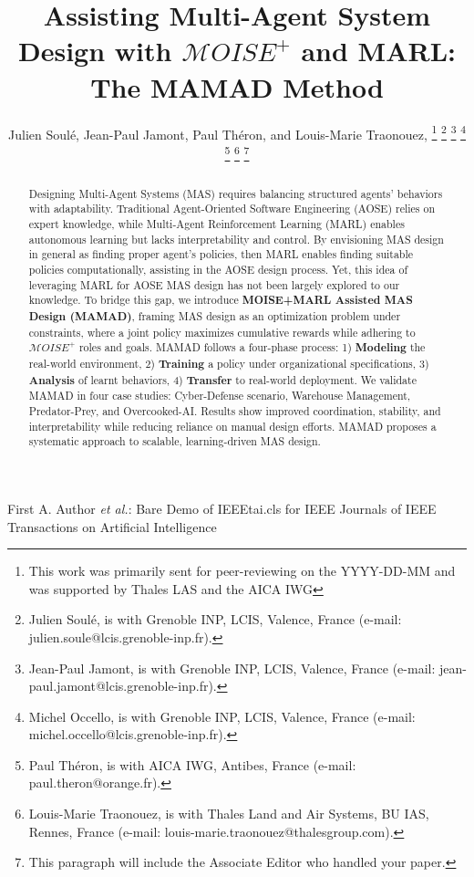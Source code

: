 \documentclass[journal]{IEEEtai}
\begin{document}
\title{Assisting Multi-Agent System Design with $\mathcal{M}OISE^+$ and MARL: The MAMAD Method} 


\author{Julien Soulé, Jean-Paul Jamont, Paul Théron, and Louis-Marie Traonouez,
\thanks{This work was primarily sent for peer-reviewing on the YYYY-DD-MM and was supported by Thales LAS and the AICA IWG}
\thanks{Julien Soulé, is with Grenoble INP, LCIS, Valence, France (e-mail: julien.soule@lcis.grenoble-inp.fr).}
\thanks{Jean-Paul Jamont, is with Grenoble INP, LCIS, Valence, France (e-mail: jean-paul.jamont@lcis.grenoble-inp.fr).}
\thanks{Michel Occello, is with Grenoble INP, LCIS, Valence, France (e-mail: michel.occello@lcis.grenoble-inp.fr).}
\thanks{Paul Théron, is with AICA IWG, Antibes, France (e-mail: paul.theron@orange.fr).}
\thanks{Louis-Marie Traonouez, is with Thales Land and Air Systems, BU IAS, Rennes, France (e-mail: louis-marie.traonouez@thalesgroup.com).}
\thanks{This paragraph will include the Associate Editor who handled your paper.}}

{First A. Author \MakeLowercase{\textit{et al.}}: Bare Demo of IEEEtai.cls for IEEE Journals of IEEE Transactions on Artificial Intelligence}

\maketitle

\begin{abstract}
Designing Multi-Agent Systems (MAS) requires balancing structured agents' behaviors with adaptability. Traditional Agent-Oriented Software Engineering (AOSE) relies on expert knowledge, while Multi-Agent Reinforcement Learning (MARL) enables autonomous learning but lacks interpretability and control. By envisioning MAS design in general as finding proper agent's policies, then MARL enables finding suitable policies computationally, assisting in the AOSE design process. Yet, this idea of leveraging MARL for AOSE MAS design has not been largely explored to our knowledge.
%
To bridge this gap, we introduce \textbf{MOISE+MARL Assisted MAS Design (MAMAD)}, framing MAS design as an optimization problem under constraints, where a joint policy maximizes cumulative rewards while adhering to $\mathcal{M}OISE^+$ roles and goals. MAMAD follows a four-phase process:
1) \textbf{Modeling} the real-world environment,  
2) \textbf{Training} a policy under organizational specifications,  
3) \textbf{Analysis} of learnt behaviors,  
4) \textbf{Transfer} to real-world deployment.
%
We validate MAMAD in four case studies: Cyber-Defense scenario, Warehouse Management, Predator-Prey, and Overcooked-AI. Results show improved coordination, stability, and interpretability while reducing reliance on manual design efforts. MAMAD proposes a systematic approach to scalable, learning-driven MAS design.
\end{abstract}
\end{document}
